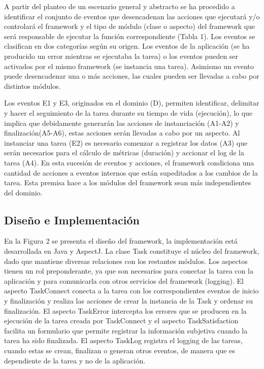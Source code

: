 A partir del planteo de un escenario general y abstracto se ha procedido a identificar el conjunto de eventos que desencadenan las acciones que ejecutará y/o controlará el framework y el tipo de módulo (clase o aspecto) del framework que será responsable de ejecutar la función correspondiente (Tabla 1).  Los  eventos se clasifican en dos categorías según su origen. Los eventos de la aplicación (se ha producido un error mientras se ejecutaba la tarea) o los eventos pueden ser activados  por el mismo framework (se instancia una tarea). Asimismo un evento puede desencadenar una o más acciones, las cuales pueden ser llevadas a cabo por distintos módulos. 


Los eventos E1 y E3, originados en el dominio (D), permiten identificar, delimitar y hacer el seguimiento de la tarea durante su tiempo de vida (ejecución), lo que implica que debidamente generarán las acciones de instanciación (A1-A2) y finalización(A5-A6), estas acciones serán llevadas a cabo por un aspecto. Al instanciar una tarea (E2) es necesario comenzar a registrar los datos (A3) que serán necesarios para el cálculo de métricas (duración) y accionar el log de la tarea (A4). En esta sucesión de eventos y acciones, el framework condiciona una cantidad de acciones a eventos internos que están supeditados a los cambios de la tarea. Esta premisa hace a los módulos del framework sean más independientes del dominio.

\subsection{Diseño e Implementación}
\label{subsec:disenio_e_implementacion}

En la Figura 2 se presenta el diseño del framework, la implementación está desarrollada en Java y AspectJ. La clase Task constituye el núcleo del framework, dado que mantiene diversas relaciones con los restantes módulos. Los aspectos tienen un rol preponderante, ya que son necesarios para conectar la tarea con la aplicación y para comunicarla con otros servicios del framework (logging). El aspecto TaskConnect conecta a la tarea con los correspondientes eventos de inicio y finalización y realiza las acciones de crear la instancia de la Task y ordenar su finalización. El aspecto TaskError intercepta los errores que se producen en la ejecución de la tarea creada por TaskConnect y el aspecto TaskSatisfaction facilita un formulario que permite registrar la información subjetiva cuando la tarea ha sido finalizada. El aspecto TaskLog registra el logging de las tareas, cuando estas se crean, finalizan o generan otros eventos, de manera que es dependiente de la tarea y no de la aplicación. 

